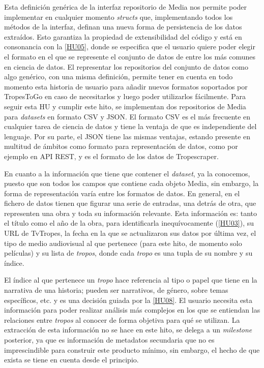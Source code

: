 Esta definición genérica de la interfaz repositorio de Media nos permite poder
implementar en cualquier momento \textit{structs} que, implementando
todos los métodos de la interfaz, definan una nueva forma de persistencia de los
datos extraídos. Esto garantiza la propiedad de extensibilidad del código y está
en consonancia con la
\href{https://github.com/jlgallego99/TropesToGo/issues/30}{[HU05]}, donde se
especifica que el usuario quiere poder elegir el formato en el que se represente
el conjunto de datos de entre los más comunes en ciencia de datos. El
representar los repositorios del conjunto de datos como algo genérico, con una
misma definición, permite tener en cuenta en todo momento esta historia de
usuario para añadir nuevos formatos soportados por TropesToGo en caso de
necesitarlos y luego poder utilizarlos fácilmente. Para seguir esta HU y cumplir
este hito, se implementan dos repositorios de Media para \textit{datasets} en
formato CSV y JSON. El formato CSV es el más frecuente en cualquier tarea de ciencia
de datos y tiene la ventaja de que es independiente del lenguaje. Por su parte,
el JSON tiene las mismas ventajas, estando presente en multitud de ámbitos como
formato para representación de datos, como por ejemplo en API REST, y es el
formato de los datos de Tropescraper.

En cuanto a la información que tiene que contener el \textit{dataset}, ya la
conocemos, puesto que son todos los campos que contiene cada objeto Media, sin
embargo, la forma de representación varía entre los formatos de datos. En
general, en el fichero de datos tienen que figurar una serie de entradas, una
detrás de otra, que representen una obra y toda su información relevante. Esta
información es: tanto el título como el año de la obra, para identificarla
inequívocamente
(\href{https://github.com/jlgallego99/TropesToGo/issues/8}{[HU03]}), su URL de
TvTropes, la fecha en la que se actualizaron sus datos por última vez, el tipo
de medio audiovisual al que pertenece (para este hito, de momento solo
películas) y su lista de \textit{tropos}, donde cada \textit{tropo} es una tupla
de su nombre y su índice. 

El índice al que pertenece un \textit{tropo} hace referencia al tipo o
papel que tiene en la narrativa de una historia; pueden ser narrativos, de
género, sobre temas específicos, etc. y es una decisión guiada por la
\href{https://github.com/jlgallego99/TropesToGo/issues/57}{[HU08]}. El usuario
necesita esta información para poder realizar análisis más complejos en los que
se entiendan las relaciones entre \textit{tropos} al conocer de forma objetiva
para qué se utilizan. La extracción de esta información no se hace en este
hito, se delega a un \textit{milestone} posterior, ya que es información de
metadatos secundaria que no es imprescindible para construir este producto
mínimo, sin embargo, el hecho de que exista se tiene en cuenta desde el
principio.


